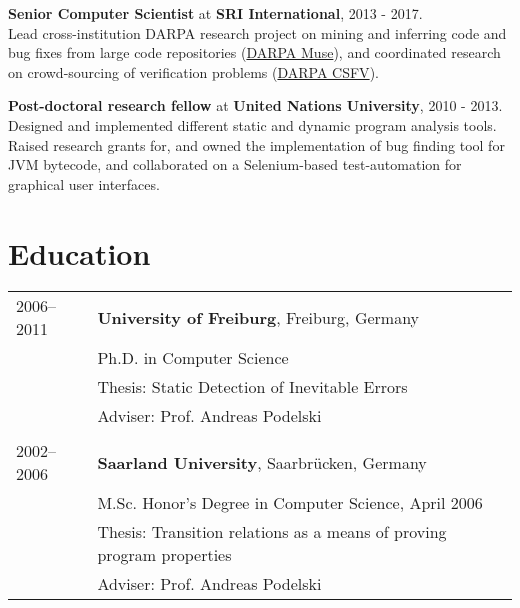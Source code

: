 \documentclass[margin,line]{res}
\begin{document}
\begin{resume}
\textbf{Senior Computer Scientist} at \textbf{SRI International}, 2013 - 2017.\\
Lead cross-institution DARPA research project on mining and inferring code and bug fixes from large code repositories
 (\href{https://www.darpa.mil/program/mining-and-understanding-software-enclaves}{DARPA Muse}), 
and coordinated research on crowd-sourcing of verification problems (\href{https://www.darpa.mil/program/crowd-sourced-formal-verification}{DARPA CSFV}).


\textbf{Post-doctoral research fellow} at \textbf{United Nations University}, 2010 - 2013.\\
Designed and implemented different static and dynamic program analysis tools.
Raised research grants for, and owned the implementation of bug finding tool for JVM bytecode, and 
collaborated on a Selenium-based test-automation for graphical user interfaces. 

\bigskip
\section{\sc Education}

\begin{tabular}{@{}ll@{}}
2006--2011 & {\bf University of Freiburg}, Freiburg, Germany\\
& Ph.D. in Computer Science\\
& Thesis: Static Detection of Inevitable Errors\\
& Adviser: Prof. Andreas Podelski \\
\\
2002--2006 & {\bf Saarland University}, Saarbr\" ucken, Germany\\
& M.Sc. Honor's Degree in Computer Science, April 2006\\
& Thesis: Transition relations as a means of proving program properties\\
& Adviser: Prof. Andreas Podelski
\end{tabular}

\newpage

\bigskip

\bigskip

\bigskip
% 
% 
%

% 

\end{resume}
\end{document}
